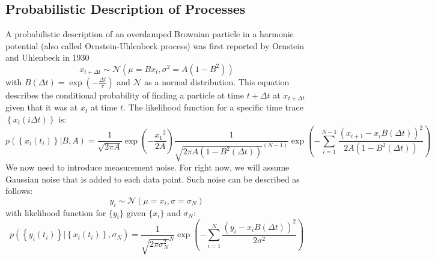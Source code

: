 \documentclass[%
 reprint,
 amsmath,amssymb,
 aps,
]{revtex4-1}
\begin{document}
\subsection{Probabilistic Description of Processes}
A probabilistic description of an overdamped Brownian particle in a harmonic potential (also called Ornstein-Uhlenbeck process) was first reported by Ornstein and Uhlenbeck in 1930 \cite{RN28}
\begin{equation}\label{OUp}
	x_{t+\Delta t} \sim \mathcal{N}(\mu=Bx_{t},\sigma^{2}=A(1-B^{2}))
\end{equation}
with $B(\Delta t) = \exp \left( { - \frac{\Delta t}{\tau}} \right)$ and $\mathcal{N}$ as a normal distribution.
This equation describes the conditional probability of finding a particle at time $t+\Delta t$ at $x_{t+\Delta t}$ given that it was at $x_{t}$ at time $t$.  The likelihood function for a specific time trace $\left\{x_i(i\Delta t)\right\}$ is:
\begin{equation}
	p\left( \left\{x_i(t_i)\right\} \left| B, A \right.\right) =
	\frac{1}{\sqrt {2 \pi A} }
	\exp \left( { - \frac{{x_1}^2}{2A}}\right)
	\frac{1}{{\sqrt {2\pi A(1-B^{2}(\Delta t))}^{(N-1)} }}
	\exp \left( { - \sum\limits_{i=1}^{N-1}\frac{{{{\left( {x_{i+1} - {x_i}B(\Delta t)} \right)}^2}}}{{2A(1-B^{2}(\Delta t))}}} \right)
\end{equation}
We now need to introduce measurement noise.  For right now, we will assume Gaussian noise that is added to each data point.  Such noise can be described as follows:
\begin{equation}
	y_{i} \sim \mathcal{N}(\mu=x_{i},\sigma=\sigma_{N})
\end{equation}
with likelihood function for $\{y_{i}\}$ given $\{x_{i}\}$ and $\sigma_{N}$:
\begin{equation}
	p\left( \left\{y_i(t_i)\right\} \left| \left\{x_i(t_i)\right\},\sigma_{N} \right.\right) =
	\frac{1}{{\sqrt {2\pi \sigma_{N}^{2}}^{N} }}
	\exp \left( { - \sum\limits_{i=1}^{N}\frac{{{{\left( {y_{i} - x_{i}B(\Delta t)} \right)}^2}}}{{2\sigma^{2}}}} \right)
\end{equation}
\end{document}
